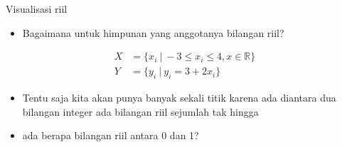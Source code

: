 \documentclass[
  ignorenonframetext,
]{beamer}
\providecommand{\tightlist}{%
  \setlength{\itemsep}{0pt}\setlength{\parskip}{0pt}}\usepackage{longtable,booktabs,array}
\begin{document}
\begin{frame}{Visualisasi riil}
\label{visualisasi-riil}
\begin{itemize}
\tightlist
\item
  Bagaimana untuk himpunan yang anggotanya bilangan riil?
\end{itemize}

\[
\begin{align*}
X&=\{x_i \ | \ -3 \leq x_i \leq 4, x \in \mathbb{R}\} \\
Y&=\{y_i \ | \  y_i=3+2x_i\}
\end{align*}
\]

\begin{itemize}
\item
  Tentu saja kita akan punya banyak sekali titik karena ada diantara dua
  bilangan integer ada bilangan riil sejumlah tak hingga
\item
  ada berapa bilangan riil antara 0 dan 1?
\end{itemize}
\end{frame}
\end{document}
